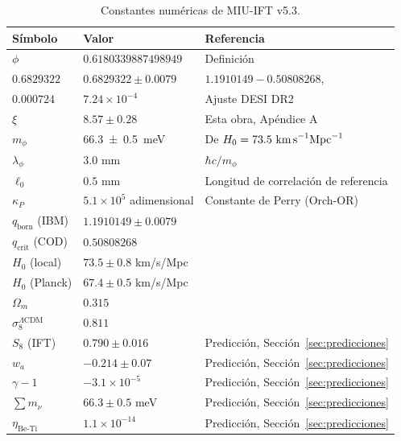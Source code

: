 \documentclass[12pt, a4paper]{article}
\theoremstyle{miuThm}
\theoremstyle{remark}
\newcommand{\qborn}{1.1910149}
\newcommand{\qcrit}{0.50808268}
\newcommand{\DeltaCOD}{0.6829322}
\newcommand{\eps}{0.000724}
\begin{document}
\begin{table}[h!]
\centering
\caption{Constantes numéricas de MIU-IFT v5.3.}
\label{tab:constantes_completas}
\begin{tabular}{lll}
\toprule
\textbf{Símbolo} & \textbf{Valor} & \textbf{Referencia} \\
\midrule
$\phi$ & $0.6180339887498949$ & Definición \\
$\DeltaCOD$ & $0.6829322 \pm 0.0079$ & $\qborn-\qcrit$, \cite{IBM2025} \\
$\eps$ & $7.24\times10^{-4}$ & Ajuste DESI DR2 \\
$\xi$ & $8.57 \pm 0.28$ & Esta obra, Apéndice A \\
$m_\phi$ & \SI{66.3 \pm 0.5}{\milli\electronvolt} & De $H_0 = 73.5\ \text{km\,s}^{-1}\text{Mpc}^{-1}$ \\
$\lambda_\phi$ & $3.0$ mm & $\hbar c/m_\phi$ \\
$\ell_0$ & $0.5$ mm & Longitud de correlación de referencia \\
$\kappa_P$ & $5.1\times10^5$ adimensional & Constante de Perry (Orch-OR) \\
$q_{\text{born}}$ (IBM) & $1.1910149 \pm 0.0079$ & \cite{IBM2025} \\
$q_{\text{crit}}$ (COD) & $0.50808268$ & \cite{Alcántara2024} \\
$H_0$ (local) & $73.5 \pm 0.8$ km/s/Mpc & \cite{Riess2022} \\
$H_0$ (Planck) & $67.4 \pm 0.5$ km/s/Mpc & \cite{Planck2020} \\
$\Omega_m$ & $0.315$ & \cite{Planck2020} \\
$\sigma_8^{\Lambda\text{CDM}}$ & $0.811$ & \cite{Planck2020} \\
$S_8$ (IFT) & $0.790 \pm 0.016$ & Predicción, Sección~\ref{sec:predicciones} \\
$w_a$ & $-0.214 \pm 0.07$ & Predicción, Sección~\ref{sec:predicciones} \\
$\gamma-1$ & $-3.1\times10^{-5}$ & Predicción, Sección~\ref{sec:predicciones} \\
$\sum m_\nu$ & $66.3 \pm 0.5$ meV & Predicción, Sección~\ref{sec:predicciones} \\
$\eta_{\text{Be-Ti}}$ & $1.1\times10^{-14}$ & Predicción, Sección~\ref{sec:predicciones} \\
\bottomrule
\end{tabular}
\end{table}
\end{document}

